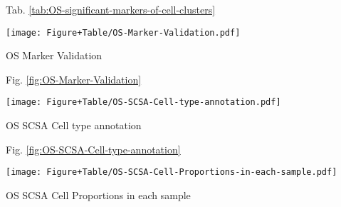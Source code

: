 \documentclass[
]{article}
\begin{document}
\begin{center}\vspace{1.5cm}\end{center}

Tab. \ref{tab:OS-significant-markers-of-cell-clusters}

\begin{center}\vspace{1.5cm}\end{center}
\def\@captype{figure}
\begin{center}
\texttt{[image: Figure+Table/OS-Marker-Validation.pdf]}
\caption{OS Marker Validation}\label{fig:OS-Marker-Validation}
\end{center}

\begin{center}\vspace{1.5cm}\end{center}

Fig. \ref{fig:OS-Marker-Validation}

\begin{center}\vspace{1.5cm}\end{center}
\def\@captype{figure}
\begin{center}
\texttt{[image: Figure+Table/OS-SCSA-Cell-type-annotation.pdf]}
\caption{OS SCSA Cell type annotation}\label{fig:OS-SCSA-Cell-type-annotation}
\end{center}

\begin{center}\vspace{1.5cm}\end{center}

Fig. \ref{fig:OS-SCSA-Cell-type-annotation}

\begin{center}\vspace{1.5cm}\end{center}
\def\@captype{figure}
\begin{center}
\texttt{[image: Figure+Table/OS-SCSA-Cell-Proportions-in-each-sample.pdf]}
\caption{OS SCSA Cell Proportions in each sample}\label{fig:OS-SCSA-Cell-Proportions-in-each-sample}
\end{center}
\end{document}
